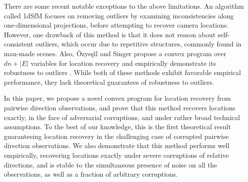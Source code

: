 There are some recent notable exceptions to the above limitations.
An algorithm called 1dSfM \cite{1dsfm} focuses on removing outliers by examining inconsistencies along one-dimensional projections, before attempting to recover camera locations. 
However, one drawback of this method is that it does not reason about self-consistent outliers, which occur due to repetitive structures, commonly found in man-made scenes. 
Also, \"{O}zye\c{s}\.{i}l  and Singer propose a convex program over $dn + |E|$ variables for location recovery and empirically demonstrate its robustness to outliers \cite{AMIT}.  While both of these methods exhibit favorable empirical performance, they lack theoretical guarantees of robustness to outliers.

In this paper, we propose a novel convex program for location recovery from pairwise direction observations, and prove that this method recovers locations exactly, in the face of adversarial corruptions, and under rather broad technical assumptions. To the best of our knowledge, this is the first theoretical result guaranteeing location recovery in the challenging case of corrupted pairwise direction observations.
We also demonstrate that this method performs well empirically, recovering locations exactly under severe corruptions of relative directions, and is stable to the simultaneous presence of noise on all the observations, as well as a fraction of arbitrary corruptions.


